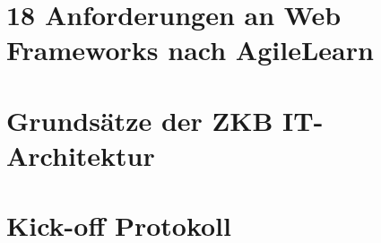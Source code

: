 \documentclass[
11pt, %
a4paper, %
BCOR25mm, %
DIV14, %
footsepline = false, %
headsepline, %
twoside, %
openright,
abstracton, %
listof=totocnumbered, %
bibliography=totocnumbered %
]{scrreprt}
\begin{document}
  

  \cleardoublepage
   
    
  \chapter{18 Anforderungen an Web Frameworks nach
  AgileLearn}\label{chapter:18AnforderungenNachAgileLearn}
 
  

  \cleardoublepage
   
    
  \chapter{Grundsätze der ZKB
  IT-Architektur}\label{chapter:GrundsaetzeDerZkbItArchitektur}
 
  

  \cleardoublepage

 
 
  \chapter{Kick-off Protokoll}\label{chapter:KickOffProtokoll}

  
  
  \cleardoublepage
  
   
\end{document}
